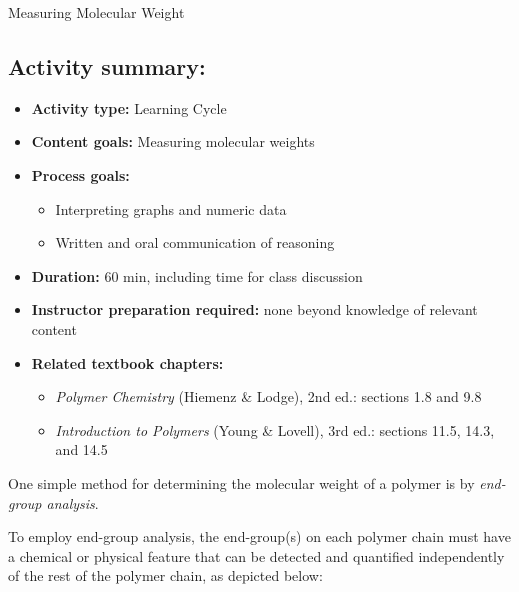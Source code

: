 \begin{activity}{Measuring Molecular Weight}
\begin{instructornotes}
	\subsection*{Activity summary:}
	\begin{itemize}
		\item \textbf{Activity type:} Learning Cycle
		\item \textbf{Content goals:} Measuring molecular weights
		\item \textbf{Process goals:} %
			\begin{itemize}
				\item Interpreting graphs and numeric data
				\item Written and oral communication of reasoning
			\end{itemize}
		\item \textbf{Duration:} 60 min, including time for class discussion
		\item \textbf{Instructor preparation required:} none beyond knowledge of relevant content
		\item \textbf{Related textbook chapters:}
			\begin{itemize}
				\item \emph{Polymer Chemistry} (Hiemenz \& Lodge), 2nd ed.: sections 1.8 and 9.8
				\item \emph{Introduction to Polymers} (Young \& Lovell), 3rd ed.: sections 11.5, 14.3, and 14.5
			\end{itemize}
	\end{itemize}
	
\end{instructornotes}




\begin{model}
\label{\labelbase:mdl:endgrpanalysis}

	One simple method for determining the molecular weight of a polymer is by \emph{end-group analysis}.
	
	To employ end-group analysis, the end-group(s) on each polymer chain must have a chemical or physical feature that can be detected and quantified independently of the rest of the polymer chain, as depicted below:
	

\end{model}
\end{activity}
